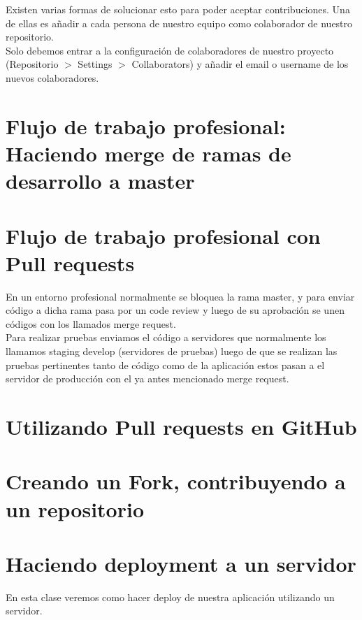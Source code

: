 \documentclass{article}
\begin{document}
Existen varias formas de solucionar esto para poder aceptar contribuciones. Una
de ellas es añadir a cada persona de nuestro equipo como colaborador de nuestro
repositorio.\\

Solo debemos entrar a la configuración de colaboradores de nuestro proyecto
(Repositorio $>$ Settings $>$ Collaborators) y añadir el email o username de los
nuevos colaboradores.\\

\section{Flujo de trabajo profesional: Haciendo merge de ramas de desarrollo a master}%

\section{Flujo de trabajo profesional con Pull requests}%
En un entorno profesional normalmente se bloquea la rama master, y para enviar
código a dicha rama pasa por un code review y luego de su aprobación se unen
códigos con los llamados merge request.\\

Para realizar pruebas enviamos el código a servidores que normalmente los
llamamos staging develop (servidores de pruebas) luego de que se realizan las
pruebas pertinentes tanto de código como de la aplicación estos pasan a el
servidor de producción con el ya antes mencionado merge request.\\

\section{Utilizando Pull requests en GitHub}%

\section{Creando un Fork, contribuyendo a un repositorio}%

\section{Haciendo deployment a un servidor}%
En esta clase veremos como hacer deploy de nuestra aplicación utilizando un
servidor.\\
\end{document}
